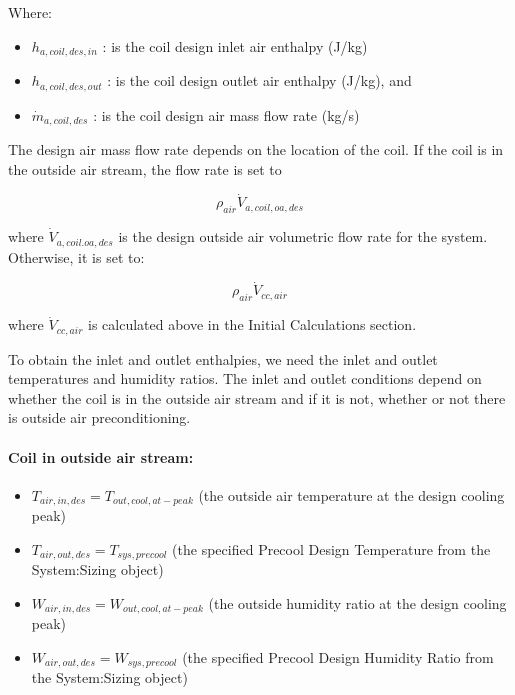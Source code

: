 Where:

\begin{itemize}
\item
  \(h_{a,coil,des,in}\) : is the coil design inlet air enthalpy (J/kg)
\item
  \(h_{a,coil,des,out}\) : is the coil design outlet air enthalpy (J/kg), and
\item
  \(\dot{m}_{a,coil,des}\) : is the coil design air mass flow rate (kg/s)
\end{itemize}

The design air mass flow rate depends on the location of the coil. If the coil is in the outside air stream, the flow rate is set to

\begin{equation}
  \rho_{air}\dot{V}_{a,coil,oa,des}
\end{equation}

where \(\dot{V}_{a,coil.oa,des}\) is the design outside air volumetric flow rate for the system. Otherwise, it is set to:

\begin{equation}
\rho_{air}\dot{V}_{cc,air}
\end{equation}

where \(\dot{V}_{cc,air}\) is calculated above in the Initial Calculations section.

To obtain the inlet and outlet enthalpies, we need the inlet and outlet temperatures and humidity ratios. The inlet and outlet conditions depend on whether the coil is in the outside air stream and if it is not, whether or not there is outside air preconditioning.

\paragraph{\textbf{Coil in outside air stream}:}\label{coil-in-outside-air-stream}

\begin{itemize}
\item
  \(T_{air,in,des} = T_{out,cool,at-peak}\) (the outside air temperature at the design cooling peak)
\item
  \(T_{air,out,des} = T_{sys,precool}\) (the specified Precool Design Temperature from the System:Sizing object)
\item
  \(W_{air,in,des} = W_{out,cool,at-peak}\) (the outside humidity ratio at the design cooling peak)
\item
  \(W_{air,out,des} = W_{sys,precool}\) (the specified Precool Design Humidity Ratio from the System:Sizing object)
\end{itemize}

